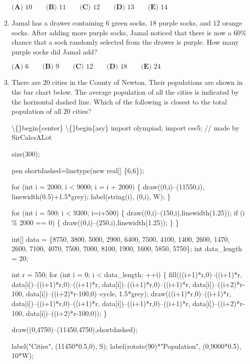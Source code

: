 \documentclass{article}
\begin{document}
\begin{enumerate}[label=\arabic*., itemsep=0.5em]
\(\textbf{(A) }10 \qquad \textbf{(B) }11 \qquad \textbf{(C) }12 \qquad \textbf{(D) }13 \qquad \textbf{(E) }14\)\par \vspace{0.5em}\item Jamal has a drawer containing \(6\) green socks, \(18\) purple socks, and \(12\) orange socks. After adding more purple socks, Jamal noticed that there is now a \(60\%\) chance that a sock randomly selected from the drawer is purple. How many purple socks did Jamal add?

\(\textbf{(A) }6 \qquad \textbf{(B) }9 \qquad \textbf{(C) }12 \qquad \textbf{(D) }18 \qquad \textbf{(E) }24\)\par \vspace{0.5em}\item There are \(20\) cities in the County of Newton. Their populations are shown in the bar chart below. The average population of all the cities is indicated by the horizontal dashed line. Which of the following is closest to the total population of all \(20\) cities?


\textbackslash\{\}begin\{center\}
\textbackslash\{\}begin\{asy\}
import olympiad;
import cse5;
// made by SirCalcsALot

size(300);

pen shortdashed=linetype(new real[] \{6,6\});

for (int i = 2000; i < 9000; i = i + 2000) \{
    draw((0,i)--(11550,i), linewidth(0.5)+1.5*grey);
    label(string(i), (0,i), W);
\}


for (int i = 500; i < 9300; i=i+500) \{
    draw((0,i)--(150,i),linewidth(1.25));
    if (i \% 2000 == 0) \{
        draw((0,i)--(250,i),linewidth(1.25));
    \}
\}

int[] data = \{8750, 3800, 5000, 2900, 6400, 7500, 4100, 1400, 2600, 1470, 2600, 7100, 4070, 7500, 7000, 8100, 1900, 1600, 5850, 5750\};
int data\_length = 20;

int r = 550;
for (int i = 0; i < data\_length; ++i) \{
    fill(((i+1)*r,0)--((i+1)*r, data[i])--((i+1)*r,0)--((i+1)*r, data[i])--((i+1)*r,0)--((i+1)*r, data[i])--((i+2)*r-100, data[i])--((i+2)*r-100,0)--cycle, 1.5*grey);
    draw(((i+1)*r,0)--((i+1)*r, data[i])--((i+1)*r,0)--((i+1)*r, data[i])--((i+1)*r,0)--((i+1)*r, data[i])--((i+2)*r-100, data[i])--((i+2)*r-100,0));
\}

draw((0,4750)--(11450,4750),shortdashed);

label("Cities", (11450*0.5,0), S);
label(rotate(90)*"Population", (0,9000*0.5), 10*W);


\end{enumerate}
\end{document}
